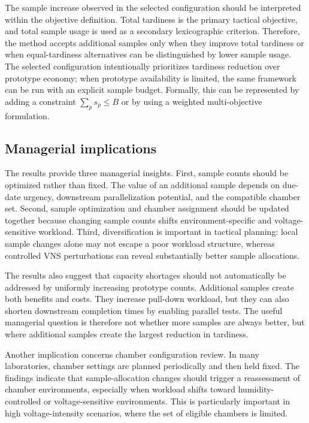 \documentclass[11pt]{article}
\begin{document}
The sample increase observed in the selected configuration should be interpreted within the objective definition. Total tardiness is the primary tactical objective, and total sample usage is used as a secondary lexicographic criterion. Therefore, the method accepts additional samples only when they improve total tardiness or when equal-tardiness alternatives can be distinguished by lower sample usage. The selected configuration intentionally prioritizes tardiness reduction over prototype economy; when prototype availability is limited, the same framework can be run with an explicit sample budget. Formally, this can be represented by adding a constraint \(\sum_p s_p\le B\) or by using a weighted multi-objective formulation.

\subsection{Managerial implications}
\label{subsec:managerial}

The results provide three managerial insights. First, sample counts should be optimized rather than fixed. The value of an additional sample depends on due-date urgency, downstream parallelization potential, and the compatible chamber set. Second, sample optimization and chamber assignment should be updated together because changing sample counts shifts environment-specific and voltage-sensitive workload. Third, diversification is important in tactical planning: local sample changes alone may not escape a poor workload structure, whereas controlled VNS perturbations can reveal substantially better sample allocations.

The results also suggest that capacity shortages should not automatically be addressed by uniformly increasing prototype counts. Additional samples create both benefits and costs. They increase pull-down workload, but they can also shorten downstream completion times by enabling parallel tests. The useful managerial question is therefore not whether more samples are always better, but where additional samples create the largest reduction in tardiness.

Another implication concerns chamber configuration review. In many laboratories, chamber settings are planned periodically and then held fixed. The findings indicate that sample-allocation changes should trigger a reassessment of chamber environments, especially when workload shifts toward humidity-controlled or voltage-sensitive environments. This is particularly important in high voltage-intensity scenarios, where the set of eligible chambers is limited.
\end{document}
